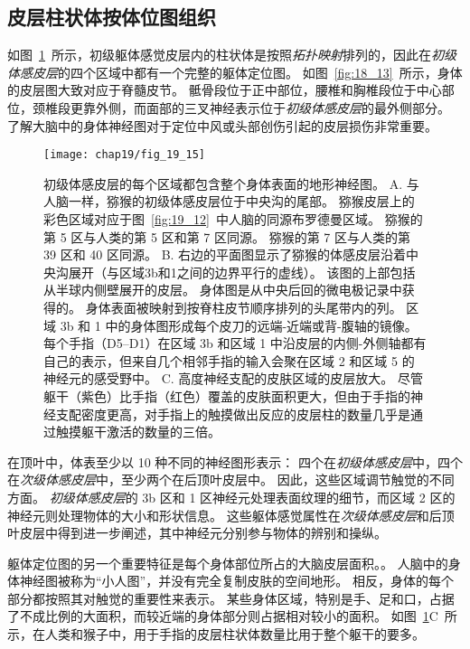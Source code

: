\subsection{皮层柱状体按体位图组织}

如图~\ref{fig:19_15}~所示，初级躯体感觉皮层内的柱状体是按照\textit{拓扑映射}排列的，因此在\textit{初级体感皮层}的四个区域中都有一个完整的躯体定位图。
如图~\ref{fig:18_13}~所示，身体的皮层图大致对应于脊髓皮节。
骶骨段位于正中部位，腰椎和胸椎段位于中心部位，颈椎段更靠外侧，而面部的三叉神经表示位于\textit{初级体感皮层}的最外侧部分。
了解大脑中的身体神经图对于定位中风或头部创伤引起的皮层损伤非常重要。


\begin{figure}[htbp]
	\centering
	\texttt{[image: chap19/fig\_19\_15]}
	\caption{初级体感皮层的每个区域都包含整个身体表面的地形神经图\cite{nelson1980representations}。
		A. 与人脑一样，猕猴的初级体感皮层位于中央沟的尾部。
		猕猴皮层上的彩色区域对应于图~\ref{fig:19_12}~中人脑的同源布罗德曼区域。
		猕猴的第 5 区与人类的第 5 区和第 7 区同源。
		猕猴的第 7 区与人类的第 39 区和 40 区同源。
		B. 右边的平面图显示了猕猴的体感皮层沿着中央沟展开（与区域3b和1之间的边界平行的虚线）。
		该图的上部包括从半球内侧壁展开的皮层。
		身体图是从中央后回的微电极记录中获得的。
		身体表面被映射到按脊柱皮节顺序排列的头尾带内的列。
		区域 3b 和 1 中的身体图形成每个皮刀的远端-近端或背-腹轴的镜像。
		每个手指（D5–D1）在区域 3b 和区域 1 中沿皮层的内侧-外侧轴都有自己的表示，但来自几个相邻手指的输入会聚在区域 2 和区域 5 的神经元的感受野中。
		C. 高度神经支配的皮肤区域的皮层放大。
		尽管躯干（紫色）比手指（红色）覆盖的皮肤面积更大，但由于手指的神经支配密度更高，对手指上的触摸做出反应的皮层柱的数量几乎是通过触摸躯干激活的数量的三倍。}
	\label{fig:19_15}
\end{figure}


在顶叶中，体表至少以 10 种不同的神经图形表示：
四个在\textit{初级体感皮层}中，四个在\textit{次级体感皮层}中，至少两个在后顶叶皮层中。
因此，这些区域调节触觉的不同方面。
\textit{初级体感皮层}的 3b 区和 1 区神经元处理表面纹理的细节，而区域 2 区的神经元则处理物体的大小和形状信息。
这些躯体感觉属性在\textit{次级体感皮层}和后顶叶皮层中得到进一步阐述，其中神经元分别参与物体的辨别和操纵。


躯体定位图的另一个重要特征是每个身体部位所占的大脑皮层面积。。
人脑中的身体神经图被称为“小人图”，并没有完全复制皮肤的空间地形。
相反，身体的每个部分都按照其对触觉的重要性来表示。 
某些身体区域，特别是手、足和口，占据了不成比例的大面积，而较近端的身体部分则占据相对较小的面积。
如图~\ref{fig:19_15}C~所示，在人类和猴子中，用于手指的皮层柱状体数量比用于整个躯干的要多。


